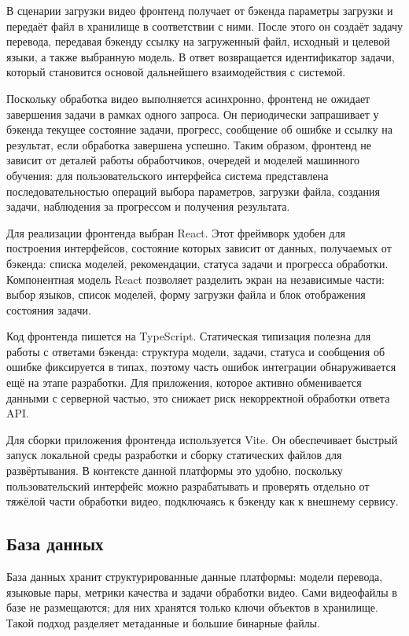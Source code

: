 \documentclass[a4paper,article,14pt]{extarticle}
\begin{document}
В сценарии загрузки видео фронтенд получает от бэкенда параметры загрузки и передаёт файл в хранилище в соответствии с ними. После этого он создаёт задачу перевода, передавая бэкенду ссылку на загруженный файл, исходный и целевой языки, а также выбранную модель. В ответ возвращается идентификатор задачи, который становится основой дальнейшего взаимодействия с системой.

Поскольку обработка видео выполняется асинхронно, фронтенд не ожидает завершения задачи в рамках одного запроса. Он периодически запрашивает у бэкенда текущее состояние задачи, прогресс, сообщение об ошибке и ссылку на результат, если обработка завершена успешно. Таким образом, фронтенд не зависит от деталей работы обработчиков, очередей и моделей машинного обучения: для пользовательского интерфейса система представлена последовательностью операций выбора параметров, загрузки файла, создания задачи, наблюдения за прогрессом и получения результата.

Для реализации фронтенда выбран React. Этот фреймворк удобен для построения интерфейсов, состояние которых зависит от данных, получаемых от бэкенда: списка моделей, рекомендации, статуса задачи и прогресса обработки. Компонентная модель React позволяет разделить экран на независимые части: выбор языков, список моделей, форму загрузки файла и блок отображения состояния задачи.

Код фронтенда пишется на TypeScript. Статическая типизация полезна для работы с ответами бэкенда: структура модели, задачи, статуса и сообщения об ошибке фиксируется в типах, поэтому часть ошибок интеграции обнаруживается ещё на этапе разработки. Для приложения, которое активно обменивается данными с серверной частью, это снижает риск некорректной обработки ответа API.

Для сборки приложения фронтенда используется Vite. Он обеспечивает быстрый запуск локальной среды разработки и сборку статических файлов для развёртывания. В контексте данной платформы это удобно, поскольку пользовательский интерфейс можно разрабатывать и проверять отдельно от тяжёлой части обработки видео, подключаясь к бэкенду как к внешнему сервису.

\subsection{База данных}

База данных хранит структурированные данные платформы: модели перевода, языковые пары, метрики качества и задачи обработки видео. Сами видеофайлы в базе не размещаются; для них хранятся только ключи объектов в хранилище. Такой подход разделяет метаданные и большие бинарные файлы.
\end{document}
